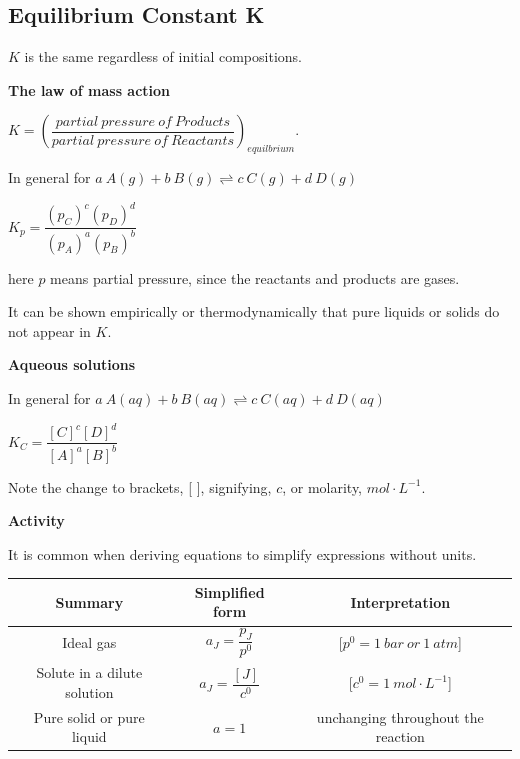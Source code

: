 \documentclass[a4paper,12pt]{article}
\begin{document}
\subsection{Equilibrium Constant K}
$K$ is the same regardless of initial compositions.\par
\textbf{The law of mass action}\par
\begin{center}
$K =(\dfrac{partial\ pressure \ of\ Products}{partial\ pressure\ of\ Reactants})_{equilbrium}$.
\end{center}\par
In general for $a\ A(g) + b\ B(g)\rightleftharpoons  c\ C(g) + d\ D(g)$
\begin{center}
$K_{p} =\dfrac{(p_{C})^{c}(p_{D})^{d}}{(p_{A})^{a}(p_{B})^{b}}$
\end{center}\par
here $p$ means partial pressure, since the reactants and products are gases.\par
It can be shown empirically or thermodynamically that pure liquids or solids do not appear in $K$.\par
\textbf{Aqueous solutions}\par
In general for $a\ A(aq) + b\ B(aq)\rightleftharpoons  c\ C(aq) + d\ D(aq)$
\begin{center}
$K_{C} =\dfrac{[C]^{c}[D]^{d}}{[A]^{a}[B]^{b}}$
\end{center}\par
Note the change to brackets, [ ], signifying, $c$, or molarity, $mol\cdot L^{-1}$.\par
\textbf{Activity}\par
It is common when deriving equations to simplify expressions without units.
\begin{center}
\renewcommand\arraystretch{1.8}
  \begin{tabular}{ccc}
    \toprule
    Summary & Simplified form & Interpretation \\
    \hline
    Ideal gas    & $a_{J} = \dfrac{p_{J}}{p^{0}}$  & [$p^{0} = 1\ bar\ or\ 1\ atm$]  \\
    Solute in a dilute solution  & $a_{J} =\dfrac{ [J]}{c^{0}}$  & [$c^{0} = 1\ mol\cdot L^{-1}$]  \\
    Pure solid or pure liquid  & $a = 1$  & unchanging throughout the reaction \\
    \bottomrule
  \end{tabular}
\end{center}
\end{document}
